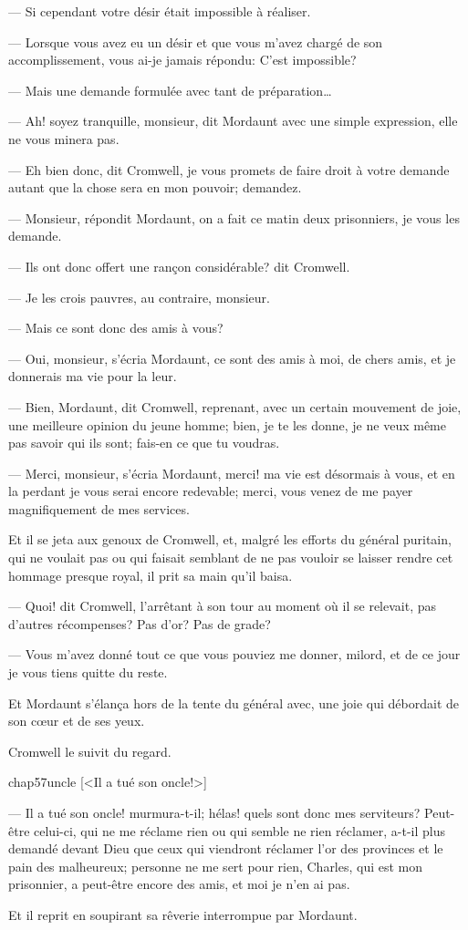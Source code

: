 — Si cependant votre désir était impossible à réaliser.

— Lorsque vous avez eu un désir et que vous m'avez chargé de son accomplissement, vous ai-je jamais répondu: C'est impossible?

— Mais une demande formulée avec tant de préparation\dots

— Ah! soyez tranquille, monsieur, dit Mordaunt avec une simple expression, elle ne vous minera pas.

— Eh bien donc, dit Cromwell, je vous promets de faire droit à votre demande autant que la chose sera en mon pouvoir; demandez.

— Monsieur, répondit Mordaunt, on a fait ce matin deux prisonniers, je vous les demande.

— Ils ont donc offert une rançon considérable? dit Cromwell.

— Je les crois pauvres, au contraire, monsieur.

— Mais ce sont donc des amis à vous?

— Oui, monsieur, s'écria Mordaunt, ce sont des amis à moi, de chers amis, et je donnerais ma vie pour la leur.

— Bien, Mordaunt, dit Cromwell, reprenant, avec un certain mouvement de joie, une meilleure opinion du jeune homme; bien, je te les donne, je ne veux même pas savoir qui ils sont; fais-en ce que tu voudras.

— Merci, monsieur, s'écria Mordaunt, merci! ma vie est désormais à vous, et en la perdant je vous serai encore redevable; merci, vous venez de me payer magnifiquement de mes services.

Et il se jeta aux genoux de Cromwell, et, malgré les efforts du général puritain, qui ne voulait pas ou qui faisait semblant de ne pas vouloir se laisser rendre cet hommage presque royal, il prit sa main qu'il baisa.

— Quoi! dit Cromwell, l'arrêtant à son tour au moment où il se relevait, pas d'autres récompenses? Pas d'or? Pas de grade?

— Vous m'avez donné tout ce que vous pouviez me donner, milord, et de ce jour je vous tiens quitte du reste.

Et Mordaunt s'élança hors de la tente du général avec, une joie qui débordait de son cœur et de ses yeux.

Cromwell le suivit du regard.

\begin{bwbigpic}
	[\basicscale] 
	{chap57uncle}
	[<Il a tué son oncle!>]
\end{bwbigpic}

— Il a tué son oncle! murmura-t-il; hélas! quels sont donc mes serviteurs? Peut-être celui-ci, qui ne me réclame rien ou qui semble ne rien réclamer, a-t-il plus demandé devant Dieu que ceux qui viendront réclamer l'or des provinces et le pain des malheureux; personne ne me sert pour rien, Charles, qui est mon prisonnier, a peut-être encore des amis, et moi je n'en ai pas.

Et il reprit en soupirant sa rêverie interrompue par Mordaunt.
